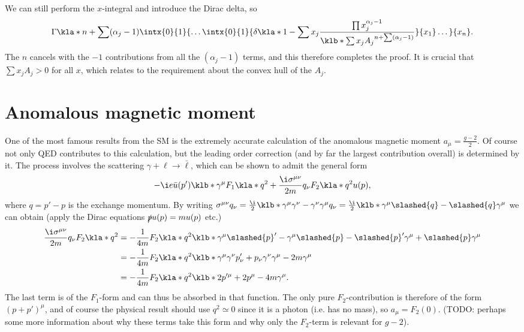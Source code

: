\documentclass[english, parskip=full]{scrbook}
\begin{document}
We can still perform the $x$-integral and introduce the Dirac delta, so
\begin{align}
\Gamma\kla*{n + \sum(\alpha_j-1)} \intx{0}{1}{\dots \intx{0}{1}{ \delta\kla*{1 - \sum x_j} \frac{\prod x_j^{\alpha_j-1}}{\klb*{\sum x_jA_j}^{n + \sum(\alpha_j-1)}} }{x_1} \dots}{x_{n}}.
\end{align}
The $n$ cancels with the $-1$ contributions from all the $(\alpha_j-1)$ terms, and this therefore completes the proof.
It is crucial that $\sum x_jA_j > 0$ for all $x$, which relates to the requirement about the convex hull of the $A_j$.
\section{Anomalous magnetic moment}
One of the most famous results from the SM is the extremely accurate calculation of the anomalous magnetic moment $a_\mu=\frac{g-2}{2}$.
Of course not only QED contributes to this calculation, but the leading order correction (and by far the largest contribution overall) is determined by it.
The process involves the scattering $\gamma+\ell \rightarrow\bar{\ell}$, which can be shown to admit the general form
\begin{align}
-\i e \bar{u}(p') \klb*{\gamma^\mu F_1\kla*{q^2} + \frac{\i \sigma^{\mu\nu}}{2m} q_\nu F_2\kla*{q^2}}u(p),
\end{align}
where $q=p'-p$ is the exchange momentum.
By writing $\sigma^{\mu\nu}q_\nu = \frac{\i}{2}\klb*{\gamma^\mu\gamma^\nu - \gamma^\nu\gamma^\mu }q_\nu = \frac{\i}{2} \klb*{\gamma^\mu \slashed{q} - \slashed{q}\gamma^\mu }$ we can obtain (apply the Dirac equations $\slashed{p}u(p)=mu(p)$ etc.)
\begin{align}
\frac{\i \sigma^{\mu\nu}}{2m} q_\nu F_2\kla*{q^2} &= -\frac{1}{4m} F_2\kla*{q^2} \klb*{ \gamma^\mu \slashed{p}' - \gamma^\mu \slashed{p} - \slashed{p}'\gamma^\mu + \slashed{p}\gamma^\mu }\\
&= -\frac{1}{4m} F_2\kla*{q^2} \klb*{ \gamma^\mu \gamma^\nu p_\nu' + p_\nu \gamma^\nu \gamma^\mu - 2m\gamma^\mu}\\
&= -\frac{1}{4m} F_2\kla*{q^2} \klb*{ 2p'^\mu + 2p^\mu - 4m\gamma^\mu}.
\end{align}
The last term is of the $F_1$-form and can thus be absorbed in that function.
The only pure $F_2$-contribution is therefore of the form $(p+p')^\mu$, and of course the physical result should use $q^2\simeq 0$ since it is a photon (i.e. has no mass), so $a_\mu=F_2(0)$. (TODO: perhaps some more information about why these terms take this form and why only the $F_2$-term is relevant for $g-2$).
\end{document}
